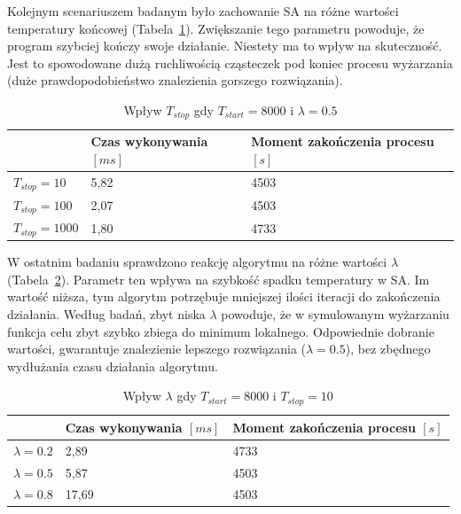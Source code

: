 Kolejnym scenariuszem badanym było zachowanie SA na różne wartości temperatury końcowej (Tabela~\ref{tstop_sa}). Zwiększanie tego parametru powoduje, że program  szybciej kończy swoje działanie. Niestety ma to wpływ na skuteczność. Jest to spowodowane dużą ruchliwością cząsteczek pod koniec procesu wyżarzania (duże prawdopodobieństwo znalezienia gorszego rozwiązania).
\begin{table}[H]
	\centering
	\label{tstop_sa}
	\caption{Wpływ $T_{stop}$ gdy $T_{start}=8000$ i $\lambda=0.5$}
	\begin{tabular}{lll}
		\toprule
		                & Czas wykonywania $[ms]$ & Moment zakończenia procesu $[s]$ \\
		\midrule
		$T_{stop}=10$   & 5,82                   & 4503                             \\
		$T_{stop}=100$  & 2,07                   & 4503                             \\
		$T_{stop}=1000$ & 1,80                   & 4733                             \\
		\bottomrule
	\end{tabular}
\end{table}

\newpage
W ostatnim badaniu sprawdzono reakcję algorytmu na różne wartości $\lambda$ (Tabela~\ref{lamda_sa}). Parametr ten wpływa na szybkość spadku temperatury w SA\@. Im wartość niższa, tym algorytm potrzębuje mniejszej ilości iteracji do zakończenia działania.
Według badań, zbyt niska $\lambda$ powoduje, że w symulowanym wyżarzaniu funkcja celu zbyt szybko zbiega do minimum lokalnego.
Odpowiednie dobranie wartości, gwarantuje znalezienie lepszego rozwiązania ($\lambda = 0.5$), bez zbędnego wydłużania czasu działania algorytmu.

\begin{table}[H]
	\centering
	\caption{Wpływ $\lambda$ gdy $T_{start}=8000$ i $T_{stop}=10$}
	\label{lamda_sa}
	\begin{tabular}{lll}
		\toprule
		              & Czas wykonywania $[ms]$ & Moment zakończenia procesu $[s]$ \\
		\midrule
		$\lambda=0.2$ & 2,89                   & 4733                             \\
		$\lambda=0.5$ & 5,87                   & 4503                             \\
		$\lambda=0.8$ & 17,69                  & 4503                             \\
		\bottomrule
	\end{tabular}
\end{table}

